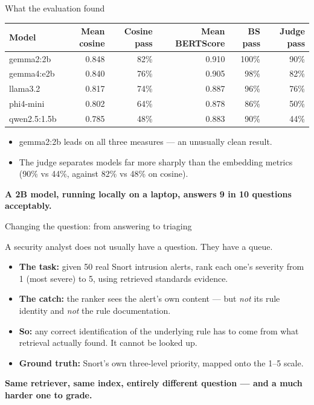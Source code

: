 \documentclass[aspectratio=169,11pt]{beamer}
\newcommand{\code}[1]{{\small\ttfamily #1}}
\newcommand{\lede}[1]{{\color{soft}\small #1\par\medskip}}
\newcommand{\keytake}[1]{%
  \vfill
  \noindent\colorbox{accenttint}{%
    \begin{minipage}{\dimexpr\textwidth-2\fboxsep-2\fboxrule\relax}
      \vspace{2pt}
      \small\color{accent}\textbf{#1}
      \vspace{2pt}
    \end{minipage}}\par}
\begin{document}
\begin{frame}{What the evaluation found}
  \leavevmode
  {\small
  \begin{tabularx}{\textwidth}{@{}l R R R R R@{}}
    \toprule
    \textbf{Model} & \textbf{Mean cosine} & \textbf{Cosine pass} & \textbf{Mean BERTScore} & \textbf{BS pass} & \textbf{Judge pass} \\
    \midrule
    \code{gemma2:2b}       & 0.848 & 82\% & 0.910 & 100\% & 90\% \\
    \code{gemma4:e2b}      & 0.840 & 76\% & 0.905 & 98\%  & 82\% \\
    \code{llama3.2}        & 0.817 & 74\% & 0.887 & 96\%  & 76\% \\
    \code{phi4-mini}       & 0.802 & 64\% & 0.878 & 86\%  & 50\% \\
    \code{qwen2.5:1.5b}    & 0.785 & 48\% & 0.883 & 90\%  & 44\% \\
    \bottomrule
  \end{tabularx}}
  \vspace{0.4em}
  {\small
  \begin{itemize}\setlength{\itemsep}{1pt}
    \item \code{gemma2:2b} leads on all three measures --- an unusually clean result.
    \item The judge separates models far more sharply than the embedding metrics
      (90\% vs 44\%, against 82\% vs 48\% on cosine).
  \end{itemize}}
  \keytake{A 2B model, running locally on a laptop, answers 9 in 10 questions acceptably.}
\end{frame}

\begin{frame}{Changing the question: from answering to triaging}
  \lede{A security analyst does not usually have a question. They have a queue.}
  \begin{itemize}
    \item \textbf{The task:} given 50 real Snort intrusion alerts, rank each one's severity
      from 1 (most severe) to 5, using retrieved standards evidence.
    \item \textbf{The catch:} the ranker sees the alert's own content --- but \emph{not} its
      rule identity and \emph{not} the rule documentation.
    \item \textbf{So:} any correct identification of the underlying rule has to come from
      what retrieval actually found. It cannot be looked up.
    \item \textbf{Ground truth:} Snort's own three-level priority, mapped onto the 1--5 scale.
  \end{itemize}
  \keytake{Same retriever, same index, entirely different question --- and a much harder one to grade.}
\end{frame}
\end{document}
